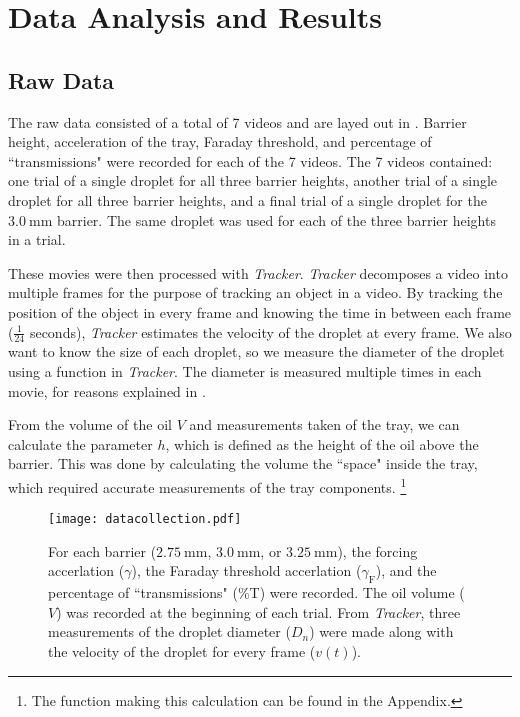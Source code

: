 \chapter{Data Analysis and Results}



\section{Raw Data}
The raw data consisted of a total of 7 videos and are layed out in . Barrier height, acceleration of the tray, Faraday threshold, and percentage of ``transmissions" were recorded for each of the 7 videos. The 7 videos contained: one trial of a single droplet for all three barrier heights, another trial of a single droplet for all three barrier heights, and a final trial of a single droplet for the $3.0~\mathrm{mm}$ barrier. The same droplet was used for each of the three barrier heights in a trial. 

These movies were then processed with \textit{Tracker}. \textit{Tracker} decomposes a video into multiple frames for the purpose of tracking an object in a video. By tracking the position of the object in every frame and knowing the time in between each frame ($\frac{1}{24}$ seconds), \textit{Tracker} estimates the velocity of the droplet at every frame. We also want to know the size of each droplet, so we measure the diameter of the droplet using a function in \textit{Tracker}. The diameter is measured multiple times in each movie, for reasons explained in .

From the volume of the oil $V$ and measurements taken of the tray, we can calculate the parameter $h$, which is defined as the height of the oil above the barrier. This was done by calculating the volume the ``space" inside the tray, which required accurate measurements of the tray components. \footnote{The function making this calculation can be found in the Appendix.}

\begin{figure}[h!]
	\centering
	\texttt{[image: datacollection.pdf]}
	\caption{For each barrier ($2.75~\mathrm{mm}$, $3.0~\mathrm{mm}$, or $3.25~\mathrm{mm}$), the forcing accerlation ($\gamma$), the Faraday threshold accerlation ($\gamma_\mathrm{F}$), and the percentage of ``transmissions" (\%T) were recorded. The oil volume ($V$) was recorded at the beginning of each trial. From \textit{Tracker}, three measurements of the droplet diameter ($D_n$) were made along with the velocity of the droplet for every frame ($v(t)$).}
	\label{datacollection}
\end{figure}




